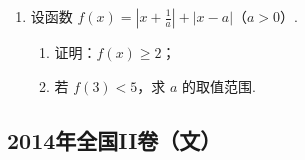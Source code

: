 \begin{description}
\begin{enumerate}[leftmargin=5pt]
        \item 设函数 \(f(x)=\left|x+\frac{1}{a}\right|+\left|x-a\right|\)（\(a>0\)）.
\begin{enumerate}
\item 证明：\(f(x)\geqslant 2\)；
\item 若 \(f(3)<5\)，求 \(a\) 的取值范围.
\end{enumerate}

    \end{enumerate}

\end{description}


\subsection{2014年全国II卷（文）}\label{gk:2014年全国II卷（文）}

